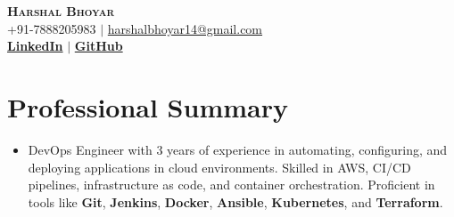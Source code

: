 \documentclass[letterpaper,11pt]{article}
\begin{document}




\begin{center}
    \textbf{\Huge \scshape Harshal Bhoyar} \\ \vspace{1pt}
    \small +91-7888205983 $|$ \href{mailto:mverma6250@gmail.com}{{harshalbhoyar14@gmail.com}}    \\ 
    \small  
    \href{https://www.linkedin.com/in/harshal-bhoyar-1971ba182/}{\bf LinkedIn} $|$
    \href{https://github.com/harshalbhoyar?tab=repositories}{\bf GitHub} 
    
\end{center}



\section{Professional Summary}
\begin{itemize}[leftmargin=0.15in, label={}]
\item 
DevOps Engineer with 3 years of experience in automating, configuring, and deploying applications in cloud environments. Skilled in AWS, CI/CD pipelines, infrastructure as code, and container orchestration. Proficient in tools like \textbf{Git}, \textbf{Jenkins}, \textbf{Docker}, \textbf{Ansible}, \textbf{Kubernetes}, and \textbf{Terraform}.


\end{itemize}
\end{document}
